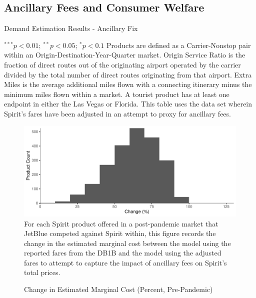 \documentclass{article}
\begin{document}
\subsection{Ancillary Fees and Consumer Welfare}

    \begin{table}
        \caption{Demand Estimation Results - Ancillary Fix}
        \label{tab:Demand_Aux_Scale}
         \vspace{-15mm}
        \begin{center}
        
        \end{center}
        \vspace{-5mm}
        \footnotesize{$^{***}p<0.01$; $^{**}p<0.05$; $^{*}p<0.1$ Products are defined as a Carrier-Nonstop pair within an Origin-Destination-Year-Quarter market. Origin Service Ratio is the fraction of direct routes out of the originating airport operated by the carrier divided by the total number of direct routes originating from that airport. Extra Miles is the average additional miles flown with a connecting itinerary minus the minimum miles flown within a market.  A tourist product has at least one endpoint in either the Las Vegas or Florida. This table uses the data set wherein Spirit's fares have been adjusted in an attempt to proxy for ancillary fees. }
    \end{table}

    \begin{figure}
        \caption{Change in Estimated Marginal Cost (Percent, Pre-Pandemic)}
        \label{tab:Fee_Fix_prepandemic_MC_PercentChange}
        \includegraphics[width = \linewidth]{Fee_Fix_prepandemic_MC_Graph_Percent_JBMarket.pdf}
        \footnotesize{For each Spirit product offered in a post-pandemic market that JetBlue competed against Spirit within, this figure records the change in the estimated marginal cost between the model using the reported fares from the DB1B and the model using the adjusted fares to attempt to capture the impact of ancillary fees on Spirit's total prices.}
    \end{figure}
    
\end{document}
